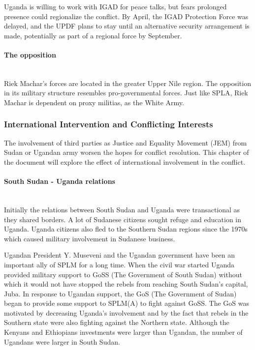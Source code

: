 \documentclass[14pt,a4paper]{article}
\begin{document}
Uganda is willing to work with IGAD for peace talks, but fears prolonged presence could regionalize the conflict. By April, the IGAD Protection Force was delayed, and the UPDF plans to stay until an alternative security arrangement is made, potentially as part of a regional force by September.

\paragraph{The opposition} \mbox{}\\
Riek Machar's forces are located in the greater Upper Nile region. The opposition in its military structure resembles pro-governmental forces. Just like SPLA, Riek Machar is dependent on proxy militias, as the White Army. 


\subsubsection{International Intervention and Conflicting Interests}
The involvement of third parties as Justice and Equality Movement (JEM) from Sudan or Ugandan army worsen the hopes for conflict resolution. This chapter of the document will explore the effect of international involvement in the conflict.  

\paragraph{South Sudan - Uganda relations} \mbox{}\\
Initially the relations between South Sudan and Uganda were transactional as they shared borders. A lot of Sudanese citizens sought refuge and education in Uganda. Uganda citizens also fled to the Southern Sudan regions since the 1970s which caused military involvement in Sudanese business. 

Ugandan President Y. Museveni and the Ugandan government have been an important ally of SPLM for a long time. When the civil war started Uganda provided military support to GoSS (The Government of South Sudan) without which it would not have stopped the rebels from reaching South Sudan's capital, Juba. In response to Ugandan support, the GoS (The Government of Sudan) began to provide some support to SPLM(A) to fight against GoSS. The GoS was motivated by decreasing Uganda's involvement and by the fact that rebels in the Southern state were also fighting against the Northern state. Although the Kenyans and Ethiopians investments were larger than Ugandan, the number of Ugandans were larger in South Sudan.
\end{document}
